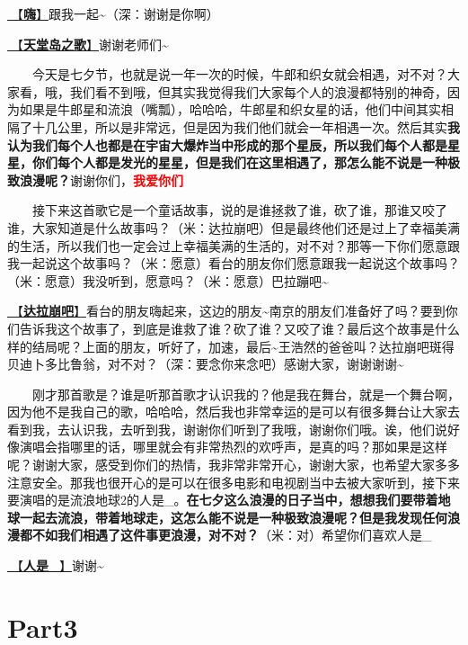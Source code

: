 \documentclass[]{ctexbook}
\begin{document}
\hyperref[say-hi]{🎵【\textbf{嗨}】}跟我一起\textasciitilde（深：谢谢是你啊）

\hyperref[haven-song]{🎵【\textbf{天堂岛之歌}】}谢谢老师们\textasciitilde{}

  今天是七夕节，也就是说一年一次的时候，牛郎和织女就会相遇，对不对？大家看，哦，我们看不到哦，但其实我觉得我们大家每个人的浪漫都特别的神奇，因为如果是牛郎星和流浪（嘴瓢），哈哈哈，牛郎星和织女星的话，他们中间其实相隔了十几公里，所以是非常远，但是因为我们他们就会一年相遇一次。然后其实\textbf{我认为我们每个人也都是在宇宙大爆炸当中形成的那个星辰，所以我们每个人都是星星，你们每个人都是发光的星星，但是我们在这里相遇了，那怎么能不说是一种极致浪漫呢？}谢谢你们，\textbf{\textcolor{red}{我爱你们~} }

  接下来这首歌它是一个童话故事，说的是谁拯救了谁，砍了谁，那谁又咬了谁，大家知道是什么故事吗？（米：达拉崩吧）但是最终他们还是过上了幸福美满的生活，所以我们也一定会过上幸福美满的生活的，对不对？那等一下你们愿意跟我一起说这个故事吗？（米：愿意）看台的朋友你们愿意跟我一起说这个故事吗？（米：愿意）我没听到，愿意吗？（米：愿意）巴拉蹦吧\textasciitilde{}

\hyperref[dalabengba]{🎵【\textbf{达拉崩吧}】}看台的朋友嗨起来，这边的朋友\textasciitilde 南京的朋友们准备好了吗？要到你们告诉我这个故事了，到底是谁救了谁？砍了谁？又咬了谁？最后这个故事是什么样的结局呢？上面的朋友，听好了，加速，最后\textasciitilde 王浩然的爸爸叫？达拉崩吧斑得贝迪卜多比鲁翁，对不对？（深：要念你来念吧）感谢大家，谢谢谢谢\textasciitilde{}

  刚才那首歌是？谁是听那首歌才认识我的？他是我在舞台，就是一个舞台啊，因为他不是我自己的歌，哈哈哈，然后我也非常幸运的是可以有很多舞台让大家去看到我，去认识我，去听到我，谢谢你们听到了我哦，谢谢你们哦。诶，他们说好像演唱会指哪里的话，哪里就会有非常热烈的欢呼声，是真的吗？那如果是这样呢？谢谢大家，感受到你们的热情，我非常非常开心，谢谢大家，也希望大家多多注意安全。那我也很开心的是可以在很多电影和电视剧当中去被大家听到，接下来要演唱的是流浪地球2的人是\_。\textbf{在七夕这么浪漫的日子当中，想想我们要带着地球一起去流浪，带着地球走，这怎么能不说是一种极致浪漫呢？但是我发现任何浪漫都不如我们相遇了这件事更浪漫，对不对？}（米：对）希望你们喜欢人是\_

\hyperref[renshi]{🎵【\textbf{人是\_}】}谢谢\textasciitilde{}

\section{Part3}\label{nanjing-20240810-part3}
\end{document}
